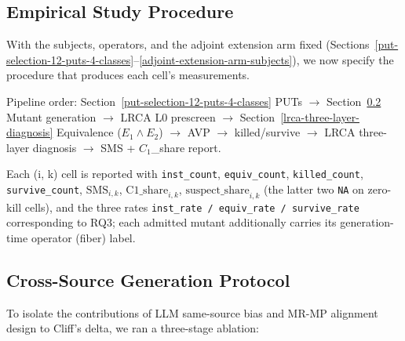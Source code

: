 \documentclass[manuscript,screen,review]{acmart}
\begin{document}
\subsection{Empirical Study Procedure}\label{procedure-overview}

With the subjects, operators, and the adjoint extension arm fixed
(Sections~\ref{put-selection-12-puts-4-classes}--\ref{adjoint-extension-arm-subjects}), we now specify the procedure that produces each cell's
measurements.

\noindent\textsf{\small Pipeline order: Section~\ref{put-selection-12-puts-4-classes} PUTs $\to$ Section~\ref{cross-source-v4-protocol-summary} Mutant generation $\to$ LRCA L0 prescreen $\to$ Section~\ref{lrca-three-layer-diagnosis} Equivalence ($E_1 \wedge E_2$) $\to$ AVP $\to$ killed/survive $\to$ LRCA three-layer diagnosis $\to$ SMS + $C_1$\_share report.}

Each (i, k) cell is reported with \texttt{inst\_count},
\texttt{equiv\_count}, \texttt{killed\_count}, \texttt{survive\_count},
$\mathrm{SMS}_{i,k}$, $\mathrm{C1\_share}_{i,k}$,
$\mathrm{suspect\_share}_{i,k}$ (the latter two \texttt{NA} on
zero-kill cells), and the
three rates \texttt{inst\_rate\ /\ equiv\_rate\ /\ survive\_rate}
corresponding to RQ3; each admitted mutant additionally carries its
generation-time operator (fiber) label.

\subsection{Cross-Source Generation Protocol}\label{cross-source-v4-protocol-summary}

To isolate the contributions of LLM same-source bias and MR-MP alignment
design to Cliff's delta, we ran a three-stage ablation:
\end{document}
